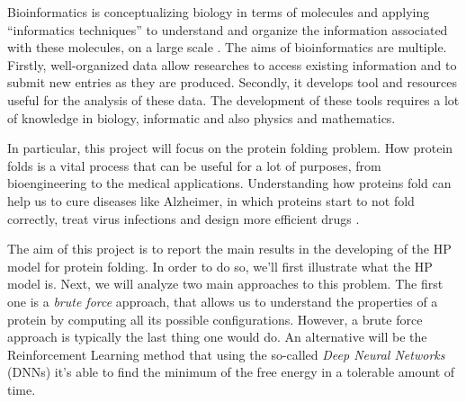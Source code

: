 Bioinformatics is conceptualizing biology in terms of molecules and applying ``informatics techniques'' to understand and organize the information associated with these molecules, on a large scale \cite{bioinfo}.
The aims of bioinformatics are multiple.
Firstly, well-organized data allow researches to access existing information and to submit new entries as they are produced.
Secondly, it develops tool and resources useful for the analysis of these data.
The development of these tools requires a lot of knowledge in biology, informatic and also physics and mathematics.

In particular, this project will focus on the protein folding problem.
How protein folds is a vital process that can be useful for a lot of purposes, from bioengineering to the medical applications.
Understanding how proteins fold can help us to cure diseases like Alzheimer, in which proteins start to not fold correctly, treat virus infections and design more efficient drugs \cite{PERM}. 

The aim of this project is to report the main results in the developing of the HP model for protein folding.
In order to do so, we'll first illustrate what the HP model is.
Next, we will analyze two main approaches to this problem.
The first one is a \emph{brute force} approach, that allows us to understand the properties of a protein by computing all its possible configurations.
However, a brute force approach is typically the last thing one would do.
An alternative will be the Reinforcement Learning method that using the so-called \emph{Deep Neural Networks} (DNNs) it's able to find the minimum of the free energy in a tolerable amount of time.